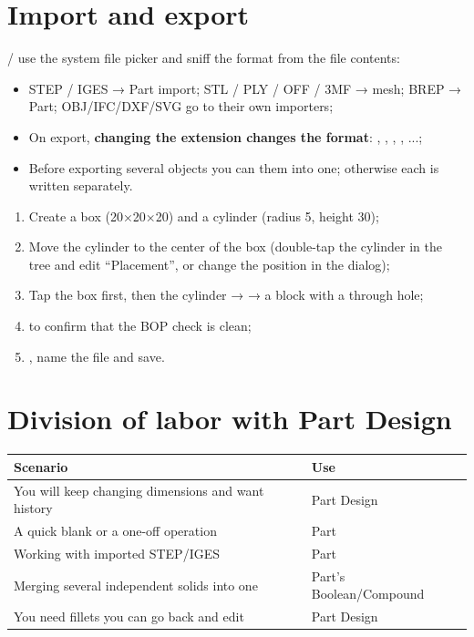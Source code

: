 \section{Import and export}

/ use the system file picker and sniff the format from the file contents:

\begin{itemize}
  \item STEP / IGES → Part import; STL / PLY / OFF / 3MF → mesh; BREP → Part; OBJ/IFC/DXF/SVG go to their own importers;
  \item On export, \textbf{changing the extension changes the format}: , , ,
        , ...;
  \item Before exporting several objects you can  them into one; otherwise each is written separately.
\end{itemize}

\begin{practice}
\begin{enumerate}
  \item Create a box (20×20×20) and a cylinder (radius 5, height 30);
  \item Move the cylinder to the center of the box (double-tap the cylinder in the tree and edit ``Placement'', or change
        the position in the dialog);
  \item Tap the box first, then the cylinder →  → a block with a through hole;
  \item {} to confirm that the BOP check is clean;
  \item {}, name the file  and save.
\end{enumerate}
\end{practice}

\section{Division of labor with Part Design}

\begin{center}
\small
\begin{tabularx}{\linewidth}{@{}lX@{}}
\toprule
\textbf{Scenario} & \textbf{Use} \\
\midrule
You will keep changing dimensions and want history & Part Design \\
A quick blank or a one-off operation & Part \\
Working with imported STEP/IGES & Part \\
Merging several independent solids into one & Part's Boolean/Compound \\
You need fillets you can go back and edit & Part Design \\
\bottomrule
\end{tabularx}
\end{center}
